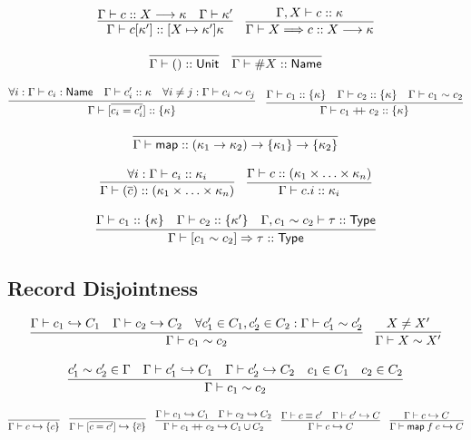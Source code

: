 \documentclass{article}
\newcommand{\mt}[1]{\mathsf{#1}}
\newcommand{\rc}{+ \hspace{-.075in} + \;}
\begin{document}
$$\infer{\Gamma \vdash c[\kappa'] :: [X \mapsto \kappa']\kappa}{
  \Gamma \vdash c :: X \longrightarrow \kappa
  & \Gamma \vdash \kappa'
}
\quad \infer{\Gamma \vdash X \Longrightarrow c :: X \longrightarrow \kappa}{
  \Gamma, X \vdash c :: \kappa
}$$

$$\infer{\Gamma \vdash () :: \mt{Unit}}{}
\quad \infer{\Gamma \vdash \#X :: \mt{Name}}{}$$

$$\infer{\Gamma \vdash [\overline{c_i = c'_i}] :: \{\kappa\}}{
  \forall i: \Gamma \vdash c_i : \mt{Name}
  & \Gamma \vdash c'_i :: \kappa
  & \forall i \neq j: \Gamma \vdash c_i \sim c_j
}
\quad \infer{\Gamma \vdash c_1 \rc c_2 :: \{\kappa\}}{
  \Gamma \vdash c_1 :: \{\kappa\}
  & \Gamma \vdash c_2 :: \{\kappa\}
  & \Gamma \vdash c_1 \sim c_2
}$$

$$\infer{\Gamma \vdash \mt{map} :: (\kappa_1 \to \kappa_2) \to \{\kappa_1\} \to \{\kappa_2\}}{}$$

$$\infer{\Gamma \vdash (\overline c) :: (\kappa_1 \times \ldots \times \kappa_n)}{
  \forall i: \Gamma \vdash c_i :: \kappa_i
}
\quad \infer{\Gamma \vdash c.i :: \kappa_i}{
  \Gamma \vdash c :: (\kappa_1 \times \ldots \times \kappa_n)
}$$

$$\infer{\Gamma \vdash [c_1 \sim c_2] \Rightarrow \tau :: \mt{Type}}{
  \Gamma \vdash c_1 :: \{\kappa\}
  & \Gamma \vdash c_2 :: \{\kappa'\}
  & \Gamma, c_1 \sim c_2 \vdash \tau :: \mt{Type}
}$$

\subsection{Record Disjointness}

$$\infer{\Gamma \vdash c_1 \sim c_2}{
  \Gamma \vdash c_1 \hookrightarrow C_1
  & \Gamma \vdash c_2 \hookrightarrow C_2
  & \forall c'_1 \in C_1, c'_2 \in C_2: \Gamma \vdash c'_1 \sim c'_2
}
\quad \infer{\Gamma \vdash X \sim X'}{
  X \neq X'
}$$

$$\infer{\Gamma \vdash c_1 \sim c_2}{
  c'_1 \sim c'_2 \in \Gamma
  & \Gamma \vdash c'_1 \hookrightarrow C_1
  & \Gamma \vdash c'_2 \hookrightarrow C_2
  & c_1 \in C_1
  & c_2 \in C_2
}$$

$$\infer{\Gamma \vdash c \hookrightarrow \{c\}}{}
\quad \infer{\Gamma \vdash [\overline{c = c'}] \hookrightarrow \{\overline{c}\}}{}
\quad \infer{\Gamma \vdash c_1 \rc c_2 \hookrightarrow C_1 \cup C_2}{
  \Gamma \vdash c_1 \hookrightarrow C_1
  & \Gamma \vdash c_2 \hookrightarrow C_2
}
\quad \infer{\Gamma \vdash c \hookrightarrow C}{
  \Gamma \vdash c \equiv c'
  & \Gamma \vdash c' \hookrightarrow C
}
\quad \infer{\Gamma \vdash \mt{map} \; f \; c \hookrightarrow C}{
  \Gamma \vdash c \hookrightarrow C
}$$
\end{document}
